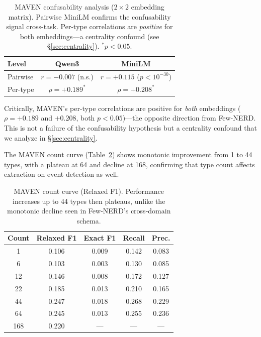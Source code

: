\documentclass[11pt,a4paper]{article}
\begin{document}
\begin{table}[t]
\centering
\small
\begin{tabular}{lcc}
\toprule
\textbf{Level} & \textbf{Qwen3} & \textbf{MiniLM} \\
\midrule
Pairwise  & $r{=}-0.007$ (n.s.)  & $r{=}+0.115$ ($p{<}10^{-30}$) \\
Per-type  & $\rho{=}+0.189^{*}$  & $\rho{=}+0.208^{*}$ \\
\bottomrule
\end{tabular}
\caption{MAVEN confusability analysis ($2{\times}2$ embedding matrix). Pairwise MiniLM confirms the confusability signal cross-task. Per-type correlations are \emph{positive} for both embeddings---a centrality confound (see \S\ref{sec:centrality}). $^{*}p{<}0.05$.}
\label{tab:maven-pairwise}
\end{table}

Critically, MAVEN's per-type correlations are positive for \emph{both} embeddings ($\rho{=}+0.189$ and $+0.208$, both $p{<}0.05$)---the opposite direction from Few-NERD.
This is not a failure of the confusability hypothesis but a centrality confound that we analyze in \S\ref{sec:centrality}.

The MAVEN count curve (Table~\ref{tab:maven-count}) shows monotonic improvement from 1 to 44 types, with a plateau at 64 and decline at 168, confirming that type count affects extraction on event detection as well.

\begin{table}[t]
\centering
\small
\begin{tabular}{ccccc}
\toprule
\textbf{Count} & \textbf{Relaxed F1} & \textbf{Exact F1} & \textbf{Recall} & \textbf{Prec.} \\
\midrule
1   & 0.106 & 0.009 & 0.142 & 0.083 \\
6   & 0.103 & 0.003 & 0.130 & 0.085 \\
12  & 0.146 & 0.008 & 0.172 & 0.127 \\
22  & 0.185 & 0.013 & 0.210 & 0.165 \\
44  & 0.247 & 0.018 & 0.268 & 0.229 \\
64  & 0.245 & 0.013 & 0.255 & 0.236 \\
168 & 0.220 & ---   & ---   & ---   \\
\bottomrule
\end{tabular}
\caption{MAVEN count curve (Relaxed F1). Performance increases up to 44 types then plateaus, unlike the monotonic decline seen in Few-NERD's cross-domain schema.}
\label{tab:maven-count}
\end{table}
\end{document}
